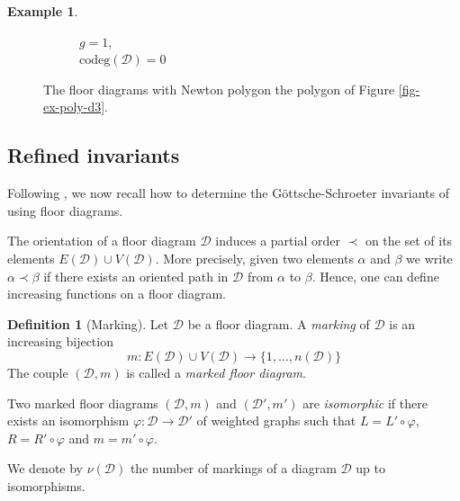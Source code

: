\documentclass[11pt]{article}
\theoremstyle{definition}
\newtheorem{defi}[theo]{Definition}
\newtheorem{exam}[theo]{Example}
\numberwithin{equation}{section}
\newcommand{\D}{\mathcal{D}}
\newcommand{\codeg}{\mathrm{codeg}}
\theoremstyle{plain}
\begin{document}
\begin{exam}
\begin{figure}[ht]
\begin{subfigure}[t]{0.24\textwidth}
	\caption{$g=1$, \\ $\codeg(\D) = 0$}
    \label{fig-ex-diag-d3-d}
\end{subfigure}
	\caption{The floor diagrams with Newton polygon the polygon of Figure \ref{fig-ex-poly-d3}.}
	\label{fig-ex-diag-d3}
\end{figure}
\end{exam}




\subsection{Refined invariants} \label{subsec-refined-invariants}

Following \cite{brugalle_polynomiality_2022}, we now recall how to determine the Göttsche-Schroeter invariants of \cite{gottsche_refined_2019} using floor diagrams.


The orientation of a floor diagram $\D$ induces a partial order $\prec$ on the set of its elements $E(\D) \cup V(\D)$. More precisely, given two elements $\alpha$ and $\beta$ we write $\alpha \prec \beta$ if there exists an oriented path in $\D$ from $\alpha$ to $\beta$.  Hence, one can define increasing functions on a floor diagram.

\begin{defi}[Marking]
Let $\D$ be a floor diagram. A \emph{marking} of $\D$ is an increasing bijection 
\[ m : E(\D) \cup V(\D) \to \{1,\dots,n(\D) \} \]
The couple $(\D,m)$ is called a \emph{marked floor diagram}.
 
 Two marked floor diagrams $(\D,m)$ and $(\D',m')$ are \emph{isomorphic} if there exists an isomorphism $\varphi : \D \to \D'$ of weighted graphs such that $L = L' \circ \varphi$, $R = R'\circ \varphi$ and $m=m' \circ \varphi$.
 
 We denote by $\nu(\D)$ the number of markings of a diagram $\D$ up to isomorphisms.
\end{defi}
\end{document}
